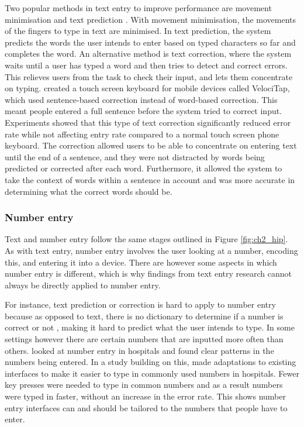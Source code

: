 \documentclass[11pt,oneside]{report}
\begin{document}
Two popular methods in text entry to improve performance are movement minimisation and text prediction \citep{MacKenzie2002}. With movement minimisation, the movements of the fingers to type in text are minimised. In text prediction, the system predicts the words the user intends to enter based on typed characters so far and completes the word. An alternative method is text correction, where the system waits until a user has typed a word and then tries to detect and correct errors. This relieves users from the task to check their input, and lets them concentrate on typing. \citet{Vertanen2015} created a touch screen keyboard for mobile devices called VelociTap, which used sentence-based correction instead of word-based correction. This meant people entered a full sentence before the system tried to correct input. Experiments showed that this type of text correction significantly reduced error rate while not affecting entry rate compared to a normal touch screen phone keyboard. The correction allowed users to be able to concentrate on entering text until the end of a sentence, and they were not distracted by words being predicted or corrected after each word. Furthermore, it allowed the system to take the context of words within a sentence in account and was more accurate in determining what the correct words should be.

\subsubsection{Number entry}
Text and number entry follow the same stages outlined in Figure \ref{fig:ch2_hip}. As with text entry, number entry involves the user looking at a number, encoding this, and entering it into a device. There are however some aspects in which number entry is different, which is why findings from text entry research cannot always be directly applied to number entry.
 
For instance, text prediction or correction is hard to apply to number entry because as opposed to text, there is no dictionary to determine if a number is correct or not \citep{Wiseman2013a}, making it hard to predict what the user intends to type. In some settings however there are certain numbers that are inputted more often than others. \citet{Wiseman2013a} looked at number entry in hospitals and found clear patterns in the numbers being entered. In a study building on this, \citet{Wiseman2013b} made adaptations to existing interfaces to make it easier to type in commonly used numbers in hospitals. Fewer key presses were needed to type in common numbers and as a result numbers were typed in faster, without an increase in the error rate. This shows number entry interfaces can and should be tailored to the numbers that people have to enter. 
\end{document}
